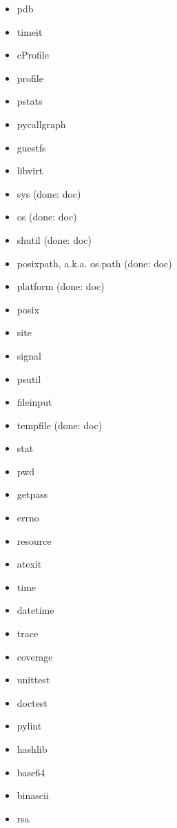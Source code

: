 \documentclass{article}
\begin{document}
\begin{enumerate}
\begin{itemize}
            \item pdb
            \item timeit
            \item cProfile
            \item profile
            \item pstats
            \item pycallgraph

            \item guestfs
            \item libvirt

            \item sys (done: doc)
            \item os (done: doc)
            \item shutil (done: doc)
            \item posixpath, a.k.a. os.path (done: doc)
            \item platform (done: doc)
            \item posix
            \item site
            \item signal
            \item psutil
            \item fileinput
            \item tempfile (done: doc)
            \item stat
            \item pwd
            \item getpass
            \item errno
            \item resource
            \item atexit

            \item time
            \item datetime

            \item trace
            \item coverage
            \item unittest
            \item doctest

            \item pylint

            \item hashlib
            \item base64
            \item binascii
            \item rsa


\end{itemize}
\end{enumerate}
\end{document}
